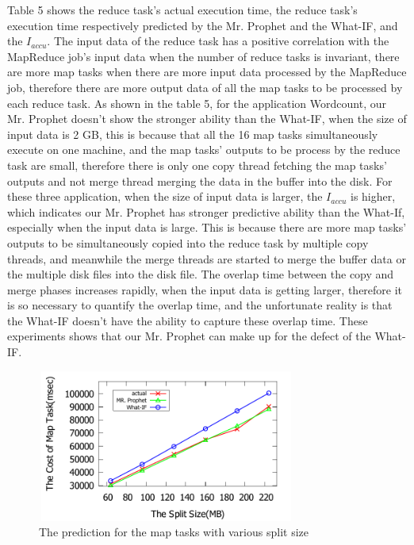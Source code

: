 Table 5 shows the reduce task's actual execution time, the reduce task's execution time respectively predicted by the Mr. Prophet and the What-IF, and the $I_{accu}$. The input data of the reduce task has a positive correlation with the MapReduce job's input data when the number of reduce tasks is invariant, there are more map tasks when there are more input data processed by the MapReduce job, therefore there are more output data of all the map tasks to be processed by each reduce task.  As shown in the table 5, for the application Wordcount, our Mr. Prophet doesn't show the stronger ability than the What-IF, when the size of input data is 2 GB, this is because that all the 16 map tasks simultaneously execute on one machine, and the map tasks' outputs to be process by the reduce task are small, therefore there is only one copy thread fetching the map tasks' outputs and not merge thread merging the data in the buffer into the disk. For these three application, when the size of input data is larger, the $I_{accu}$ is higher, which indicates our Mr. Prophet has stronger predictive ability than the What-If, especially when the input data is large. This is because there are more map tasks' outputs to be simultaneously copied into the reduce task by multiple copy threads, and meanwhile the merge threads are started to merge the buffer data or the multiple disk files into the disk file. The overlap time between the copy and merge phases increases rapidly, when the input data is getting larger, therefore it is so necessary to quantify the overlap time, and the unfortunate reality is that the What-IF doesn't have the ability to capture these overlap time. These experiments shows that our Mr. Prophet can make up for the defect of the What-IF.
\begin{figure}[htbp]
\centering
\includegraphics[height=5cm, width=8.5cm]{split}
\caption{The prediction for the map tasks with various split size}
\end{figure}

